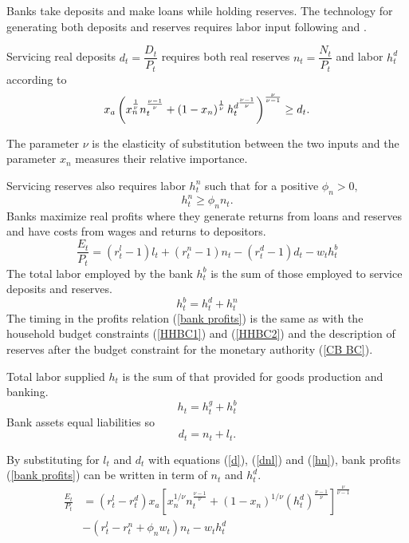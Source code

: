 \documentclass[]{article}
\begin{document}
Banks take deposits and make loans while holding reserves. The technology
for generating both deposits and reserves requires labor input following
\textcite{christiano1995inside} and \textcite{ireland2014macroeconomics}.

Servicing real deposits $d_{t}=\dfrac{D_{t}}{P_{t}}$ requires both real reserves $n_{t}=\dfrac{N_{t}}{P_{t}}$ and
labor $h_{t}^{d}$ according to
\begin{equation} \label{d}
x_{a}\left( x_{n}^{\frac{1}{\nu }}n_{t}^{\frac{\nu -1}{\nu }}+\left(
1-x_{n}\right) ^{\frac{1}{\nu }}h_{t}^{d^{\frac{\nu -1}{\nu }}}\right) ^{%
\frac{\nu }{\nu -1}}\geq d_{t}.
\end{equation}

The parameter $\nu $ is the elasticity of substitution between the two
inputs and the parameter $x_{n}$ measures their relative importance. 

Servicing reserves also requires labor $h_{t}^{n}$ such that for a positive $%
\phi _{n}>0,$%
\begin{equation} \label{hn}
h_{t}^{n}\geq \phi _{n}n_{t}.
\end{equation}
Banks maximize real profits where they generate returns from loans and reserves and have costs
from wages and returns to depositors.
\begin{equation} \label{bank profits}
\frac{E_{t}}{P_{t}}=\left( r_{t}^{l}-1\right) l_{t}+\left(
r_{t}^{n}-1\right) n_{t}-\left( r_{t}^{d}-1\right) d_{t}-w_{t}h_{t}^{b}
\end{equation}%
The total labor employed by the bank $h_{t}^{b}$ is the sum of those
employed to service deposits and reserves. 
\begin{equation} \label{hb}
h_{t}^{b}=h_{t}^{d}+h_{t}^{n}
\end{equation}
The timing in the profits relation (\ref{bank profits}) is the same as with the household budget constraints (\ref{HHBC1}) and (\ref{HHBC2}) and the description of reserves after the budget constraint for the monetary authority (\ref{CB BC}).

Total labor supplied $h_{t}$ is the sum of that provided for goods production and banking.
\begin{equation} \label{h}
h_{t}=h_{t}^{g}+h_{t}^{b}
\end{equation}
Bank assets equal liabilities so
\begin{equation} \label{dnl}
d_{t}=n_{t}+l_{t}.
\end{equation}

By substituting for $l_{t}$ and $d_{t}$ with equations (\ref{d}), (\ref{dnl}) and (\ref{hn}), bank profits (\ref{bank profits}) can be written in term of $n_{t}$ and $h_{t}^{d}$.
\begin{equation}
\begin{split}
\frac{E_{t}}{P_{t}}& =(r_{t}^l-r_{t}^d)x_{a}\left[x_{n}^{1/\nu}n_{t}^{\frac{\nu-1}{\nu}}+(1-x_{n})^{1/\nu}(h_{t}^{d})^{\frac{\nu-1}{\nu}}\right]^{\frac{\nu}{\nu-1}} \\
&-(r_{t}^{l}-r_{t}^{n}+\phi_{n}w_{t})n_{t}-w_{t}h_{t}^{d}
\end{split}
\end{equation}
\end{document}

